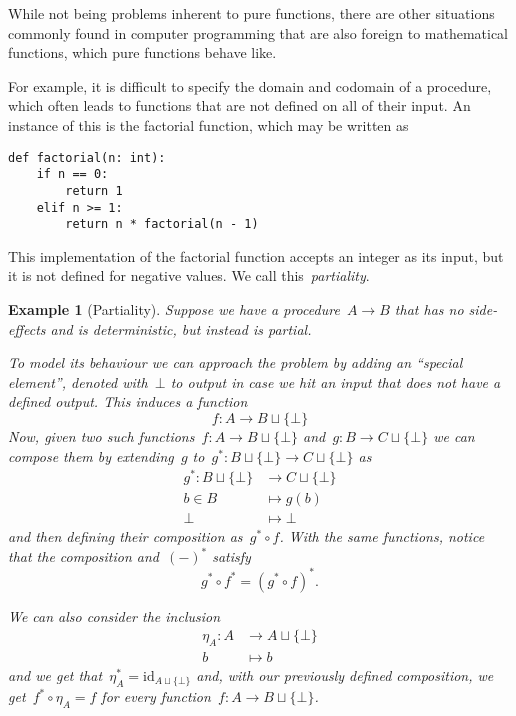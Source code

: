 \documentclass[a4paper]{article}
\theoremstyle{plain}
\newtheorem{example}[theorem]{Example}
\theoremstyle{definition}
\newcommand{\id}{\mathrm{id}}
\begin{document}
While not being problems inherent to pure functions, there are other situations
commonly found in computer programming that are also foreign to mathematical
functions, which pure functions behave like.

For example, it is difficult to specify the domain and codomain of a procedure,
which often leads to functions that are not defined on all of their input. An
instance of this is the factorial function, which may be written as
\begin{verbatim}
def factorial(n: int):
    if n == 0:
        return 1
    elif n >= 1:
        return n * factorial(n - 1)
\end{verbatim}
This implementation of the factorial function accepts an integer as its input,
but it is not defined for negative values. We call this~\emph{partiality}.

\begin{example}[Partiality]
    \label{ex:kleisli-partiality}
    Suppose we have a procedure~\(A\longrightarrow B\) that has no side-effects
    and is deterministic, but instead is partial.

    To model its behaviour we can approach the problem by adding an ``special
    element'', denoted with~\(\bot\) to output in case we hit an input that does
    not have a defined output. This induces a function
    \[
        f:A\longrightarrow B\sqcup\{\bot\}
    \]
    Now, given two such functions~\(f:A\longrightarrow B\sqcup\{\bot\}\)
    and~\(g:B\longrightarrow C\sqcup\{\bot\}\) we can compose them by
    extending~\(g\) to~\(g^{\ast}:B\sqcup\{\bot\}\longrightarrow C\sqcup\{\bot\}\) as
    \begin{align*}
        g^{\ast}:B\sqcup\{\bot\}&\longrightarrow C\sqcup\{\bot\} \\
        b\in B&\longmapsto g(b) \\
        \bot&\longmapsto\bot
    \end{align*}
    and then defining their composition as~\(g^{\ast}\circ f\). With the same
    functions, notice that the composition and~\((-)^{\ast}\) satisfy
    \[
        g^{\ast}\circ f^{\ast} = (g^{\ast}\circ f)^{\ast}.
    \]

    We can also consider the inclusion
    \begin{align*}
        \eta_{A}:A&\longrightarrow A\sqcup\{\bot\} \\
        b&\longmapsto b
    \end{align*}
    and we get that~\(\eta_{A}^{\ast}=\id_{A\sqcup\{\bot\}}\) and, with our previously
    defined composition, we get~\(f^{\ast}\circ\eta_{A}=f\) for every
    function~\(f:A\longrightarrow B\sqcup\{\bot\}\).
\end{example}
\end{document}
